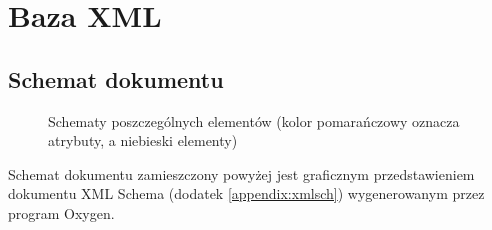 \section{Baza XML}

\subsection{Schemat dokumentu}

\begin{figure}[h]
 \centering
 \caption{Schematy poszczególnych elementów (kolor pomarańczowy oznacza atrybuty, a niebieski elementy)}
\end{figure}



Schemat dokumentu zamieszczony powyżej jest graficznym przedstawieniem dokumentu XML Schema (dodatek \ref{appendix:xmlsch}) 
wygenerowanym przez program Oxygen.

